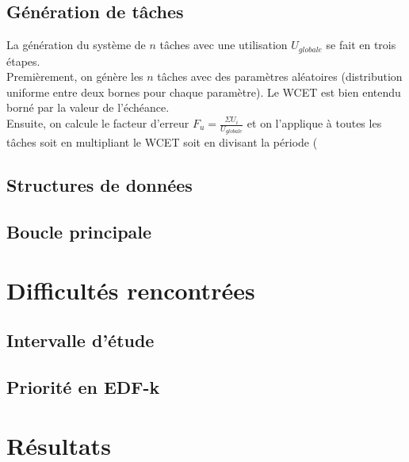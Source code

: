 \documentclass[a4paper,10pt]{article}
\begin{document}
\subsection{Génération de tâches}
La génération du système de $n$ tâches avec une utilisation $U_{globale}$ se fait en trois étapes.\\

Premièrement, on génère les $n$ tâches avec des paramètres aléatoires (distribution uniforme entre deux bornes pour chaque paramètre). Le WCET est bien entendu borné par la valeur de l'échéance.\\

Ensuite, on calcule le facteur d'erreur $F_u = \frac{\Sigma U_i}{U_{globale}}$ et on l'applique à toutes les tâches soit en multipliant le WCET soit en divisant la période (

\subsection{Structures de données}

\subsection{Boucle principale}

\section{Difficultés rencontrées}
\subsection{Intervalle d'étude}

\subsection{Priorité en EDF-k}

\section{Résultats}
\end{document}
